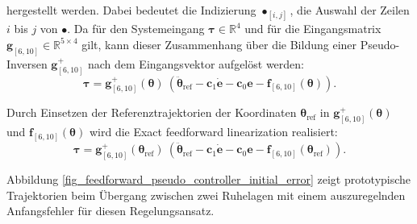 hergestellt werden. Dabei bedeutet die Indizierung $\bullet_{[i, j]}$, die Auswahl der Zeilen $i$ bis $j$ von $\bullet$. Da für den Systemeingang $\boldsymbol{\tau} \in \mathbb{R}^4$ und für die Eingangsmatrix $\mathbf{g}_{[6, 10]} \in \mathbb{R}^{5 \times 4}$ gilt, kann dieser Zusammenhang über die Bildung einer Pseudo-Inversen $\mathbf{g}_{[6, 10]}^+$ nach dem Eingangsvektor aufgelöst werden:
\begin{equation}
	\boldsymbol{\tau}= \mathbf{g}^{+}_{[6, 10]} (\boldsymbol{\theta}) \ (\ddot{\boldsymbol{\theta}}_{\text{ref}} - \mathbf{c}_{1} \mathbf{\dot{e}} - \mathbf{c}_{0} \mathbf{e} - \mathbf{f}_{[6, 10]}(\boldsymbol{\theta})).
\end{equation}

Durch Einsetzen der Referenztrajektorien der Koordinaten $\boldsymbol{\theta}_{\text{ref}}$ in $\mathbf{g}_{[6, 10]}^+(\boldsymbol{\theta})$ und $\mathbf{f}_{[6, 10]}(\boldsymbol{\theta})$ wird die Exact feedforward linearization realisiert:
\begin{equation}
\label{eq:control_law__ff_lin_pseudo}
\boldsymbol{\tau}= \mathbf{g}^{+}_{[6, 10]} (\boldsymbol{\theta}_{\text{ref}}) \ (\ddot{\boldsymbol{\theta}}_{\text{ref}} - \mathbf{c}_{1} \mathbf{\dot{e}} - \mathbf{c}_{0} \mathbf{e} - \mathbf{f}_{[6, 10]}(\boldsymbol{\theta}_{\text{ref}})).
\end{equation} 

Abbildung \ref{fig_feedforward_pseudo_controller_initial_error} zeigt prototypische Trajektorien beim Übergang zwischen zwei Ruhelagen mit einem auszuregelnden Anfangsfehler für diesen Regelungsansatz.

